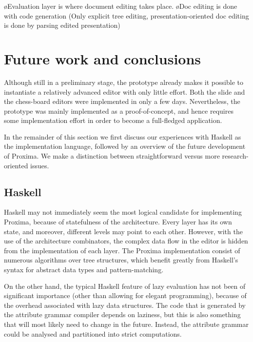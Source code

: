 \bl
\o Evaluation layer is where document editing takes place. 
\o Doc editing is done with code generation (Only explicit tree editing, presentation-oriented doc editing is done by parsing edited presentation)
\el
\ec


\section{Future work and conclusions} \label{sect:protoConcl}

Although still in a preliminary stage, the prototype already makes it possible to instantiate a relatively advanced editor with only little effort. Both the slide and the chess-board editors were implemented in only a few days. Nevertheless, the prototype was mainly implemented as a proof-of-concept, and hence requires some implementation effort in order to become a full-fledged application.

In the remainder of this section we first discuss our experiences with Haskell as the implementation language, followed by an overview of the future development of Proxima. We make a distinction between straightforward versus more research-oriented  issues.

\subsection{Haskell}

Haskell may not immediately seem the most logical candidate for implementing Proxima, because of statefulness of the architecture. Every layer has its own state, and moreover, different levels may point to each other. However, with the use of  the architecture combinators, the complex data flow in the editor is hidden from the implementation of each layer. The Proxima implementation consist of numerous algorithms over tree structures, which benefit greatly from Haskell's syntax for abstract data types and pattern-matching. 

On the other hand, the typical Haskell feature of lazy evaluation has not been of significant importance (other than allowing for elegant programming), because of the overhead associated with lazy data structures. The code that is generated by the attribute grammar compiler depends on laziness, but this is also something that will most likely need to change in the future. Instead, the attribute grammar could be analysed and partitioned into strict computations.


